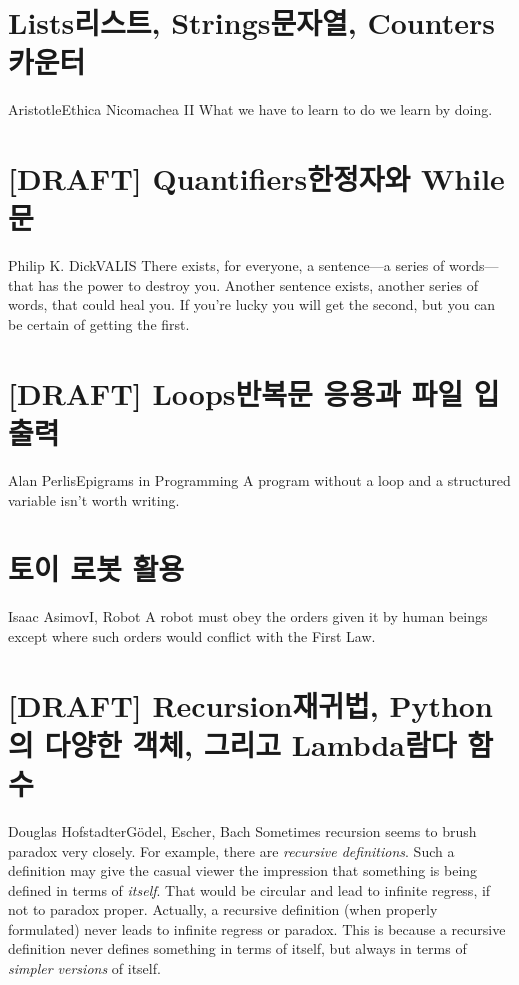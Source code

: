\documentclass[a4paper,10pt]{memoir}
\begin{document}
\chapter{Lists리스트, Strings문자열, Counters카운터}
\begin{epi}{Aristotle}{Ethica Nicomachea II}
  What we have to learn to do we learn by doing.
\end{epi}


\chapter{[DRAFT] Quantifiers한정자와 While 문}
\begin{epi}{Philip K. Dick}{VALIS}
  There exists, for everyone, a sentence---a series of words---that has the power to destroy you.
  Another sentence exists, another series of words, that could heal you.
  If you're lucky you will get the second, but you can be certain of getting the first.
\end{epi}


\chapter{[DRAFT] Loops반복문 응용과 파일 입출력}
\begin{epi}{Alan Perlis}{Epigrams in Programming}
  A program without a loop and a structured variable isn't worth writing.
\end{epi}


\chapter{토이 로봇 활용}
\begin{epi}{Isaac Asimov}{I, Robot}
  A robot must obey the orders given it by human beings except where such orders would conflict with the First Law.
\end{epi}


\chapter{[DRAFT] Recursion재귀법, Python의 다양한 객체, 그리고 Lambda람다 함수}
\begin{epi}{Douglas Hofstadter}{Gödel, Escher, Bach}
  Sometimes recursion seems to brush paradox very closely.
  For example, there are \emph{recursive definitions}.
  Such a definition may give the casual viewer the impression that something is being defined in terms of \emph{itself}.
  That would be circular and lead to infinite regress, if not to paradox proper.
  Actually, a recursive definition (when properly formulated) never leads to infinite regress or paradox.
  This is because a recursive definition never defines something in terms of itself, but always in terms of \emph{simpler versions} of itself.
\end{epi}

\end{document}

